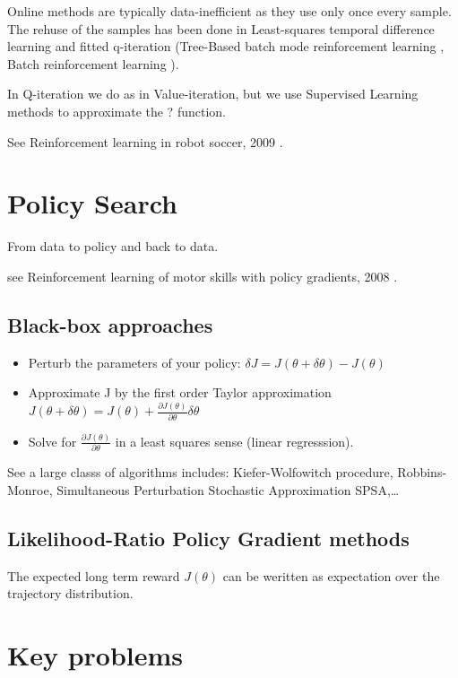 \documentclass[b5paper]{report}
\begin{document}
Online methods are typically data-inefficient as they use only once every
sample. The rehuse of the samples has been done in Least-squares temporal
difference learning and fitted q-iteration (Tree-Based batch mode reinforcement
learning \cite{ernst2005tree}, Batch reinforcement learning
\cite{lange2012batch}).

In Q-iteration we do as in Value-iteration, but we use Supervised Learning
methods to approximate the ? function.

See Reinforcement learning in robot soccer, 2009
\cite{riedmiller2009reinforcement}.


\section{Policy Search}

From data to policy and back to data.

see Reinforcement learning of motor skills with policy gradients, 2008
\cite{peters2008reinforcement}.

\subsection{Black-box approaches}


\begin{itemize}
  \item Perturb the parameters of your policy: $\delta J = J(\theta + \delta
    \theta) - J(\theta)$
  \item Approximate J by the first order Taylor approximation $J(\theta +
    \delta\theta) = J(\theta) + \frac{\partial
    J(\theta)}{\partial\theta}\delta\theta$
  \item Solve for $\frac{\partial J(\theta)}{\partial \theta}$ in a least
    squares sense (linear regresssion).
\end{itemize}

See a large classs of algorithms includes: Kiefer-Wolfowitch procedure,
Robbins-Monroe, Simultaneous Perturbation Stochastic Approximation SPSA,\dots

\subsection{Likelihood-Ratio Policy Gradient methods}

The expected long term reward $J(\theta)$ can be weritten as expectation over
the trajectory distribution.

\section{Key problems}
\end{document}

